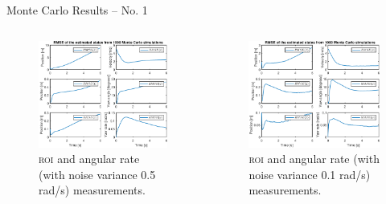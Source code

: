 \documentclass{beamer}
\newcommand{\roi}{\textsc{roi}\xspace}
\begin{document}
\begin{frame}{Monte Carlo Results -- No. 1}
	\begin{columns}[T]
	\begin{figure}
		\includegraphics[width=\textwidth]{MC/21_MC_1000_Rmse}
		\caption{\roi and angular rate (with noise variance 0.5 rad/s) measurements.}
	\end{figure}
	\begin{figure}
		\includegraphics[width=\textwidth]{MC/20_MC_1000_Rmse}
		\caption{\roi and angular rate (with noise variance 0.1 rad/s) measurements.}
	\end{figure}
	\end{columns}
\end{frame}
\end{document}
